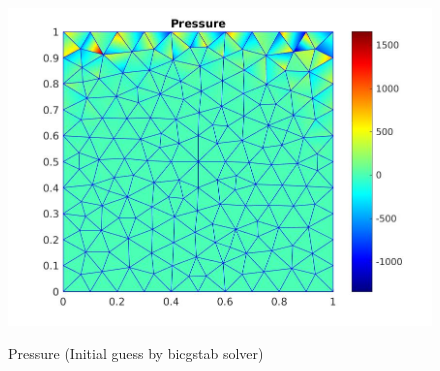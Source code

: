 \documentclass[a4paper]{book}
\begin{document}
\begin{figure}
\begin{minipage}[c]{0.67\textwidth}
    \includegraphics[width=\textwidth]{lid_newton_pressure_bicgstab.jpg}
  \end{minipage}\hfill
  \begin{minipage}[c]{0.3\textwidth}
    \caption{Pressure (Initial guess by bicgstab solver)}
  \label{pressure_navier_stoke_bicgstab_lid}
  \end{minipage}
\caption{\label{lid_driven_cavity_n_s_bicgstab}}
\end{figure}
\end{document}
